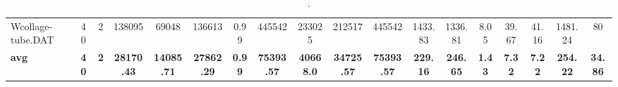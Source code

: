 \begin{sidewaystable}[h]
{\begin{tabular}{lccccccccccccccccc}
Wcollage-tube.DAT & 40 & 2 & 138095 & 69048 & 136613 & 0.99 & 445542 & 233025 & 212517 & 445542 & 1433.83 & 1336.81 & 8.05 & 39.67 & 41.16 & 1481.24 & 80\\
\cline{1-18} \textbf{avg} & \textbf{40} & \textbf{2} & \textbf{28170.43} & \textbf{14085.71} & \textbf{27862.29} & \textbf{0.99} & \textbf{75393.57} & \textbf{40668.0} & \textbf{34725.57} & \textbf{75393.57} & \textbf{229.16} & \textbf{246.65} & \textbf{1.43} & \textbf{7.32} & \textbf{7.22} & \textbf{254.22} & \textbf{34.86} \\ \cline{1-18}
\bottomrule
\end{tabular}%
}%
\caption{.}
\label{tab:table_bc_EPB}
\end{sidewaystable}

